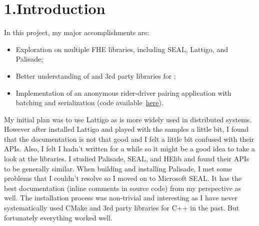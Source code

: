 \documentclass[12pt]{article}
\begin{document}
\mdxtitleblockstart{}
\mdxauthorstart{}


\mdxauthorend\mdtitleauthorrunning{}{}\mdxtitleblockend%

\section{1.\hspace*{0.5em}Introduction}\label{sec-intro}%

\noindent{}In this project, my major accomplishments are:%

\begin{itemize}[noitemsep,topsep=\mdcompacttopsep]%

\item{}Exploration on multiple FHE libraries, including SEAL, Lattigo, and Palisade;%

\item{}Better understanding of  and 3rd party libraries for ;%

\item{}Implementation of an anonymous rider-driver pairing application with batching and serialization (code available~\href{https://github.com/Reapor-Yurnero/obliviousRiding_SEAL}{here}).%
\end{itemize}%

\noindent{}My initial plan was to use Lattigo as  is more widely used in distributed systems. However after installed Lattigo and played with the samples a little bit, I found that the documentation is not that good and I felt a little bit confused with their APIs. Also, I felt I hadn't written  for a while so it might be a good idea to take a look at the  libraries. I studied Palisade, SEAL, and HElib and found their APIs to be generally similar. When building and installing Palisade, I met some problems that I couldn't resolve so I moved on to Microsoft SEAL. It has the best documentation (inline comments in source code) from my perspective as well. The installation process was non-trivial and interesting as I have never systematically used CMake and 3rd party libraries for C++ in the past. But fortunately everything worked well.%
\end{document}
